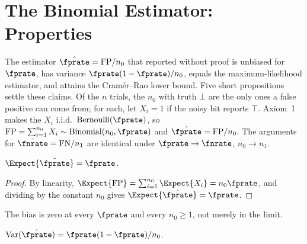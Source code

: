 %

\section{The Binomial Estimator: Properties}
\label{sec:binomial-estimator}

The estimator $\hat{\fprate} = \mathrm{FP}/n_0$ that
 reported without proof is unbiased for $\fprate$,
has variance $\fprate(1 - \fprate)/n_0$, equals the maximum-likelihood
estimator, and attains the Cram\'er--Rao lower bound. Five short propositions
settle these claims. Of the $n$ trials, the $n_0$ with truth $\bot$ are the
only ones a false positive can come from; for each, let $X_i = 1$ if the noisy
bit reports $\top$. Axiom~1 makes the $X_i$ i.i.d.\ $\mathrm{Bernoulli}
(\fprate)$, so $\mathrm{FP} = \sum_{i=1}^{n_0} X_i \sim
\mathrm{Binomial}(n_0, \fprate)$ and $\hat{\fprate} = \mathrm{FP}/n_0$. The
arguments for $\hat{\fnrate} = \mathrm{FN}/n_1$ are identical under
$\fprate \to \fnrate$, $n_0 \to n_1$.

\begin{proposition}[Unbiasedness]
\label{prop:binomial-unbiased}
$\Expect{\hat{\fprate}} = \fprate$.
\end{proposition}

\begin{proof}
By linearity, $\Expect{\mathrm{FP}} = \sum_{i=1}^{n_0} \Expect{X_i} = n_0
\fprate$, and dividing by the constant $n_0$ gives $\Expect{\hat{\fprate}} =
\fprate$.
\end{proof}

The bias is zero at every $\fprate$ and every $n_0 \ge 1$, not merely in the
limit.

\begin{proposition}[Variance]
\label{prop:binomial-variance}
$\mathrm{Var}(\hat{\fprate}) = \fprate(1 - \fprate)/n_0$.
\end{proposition}


